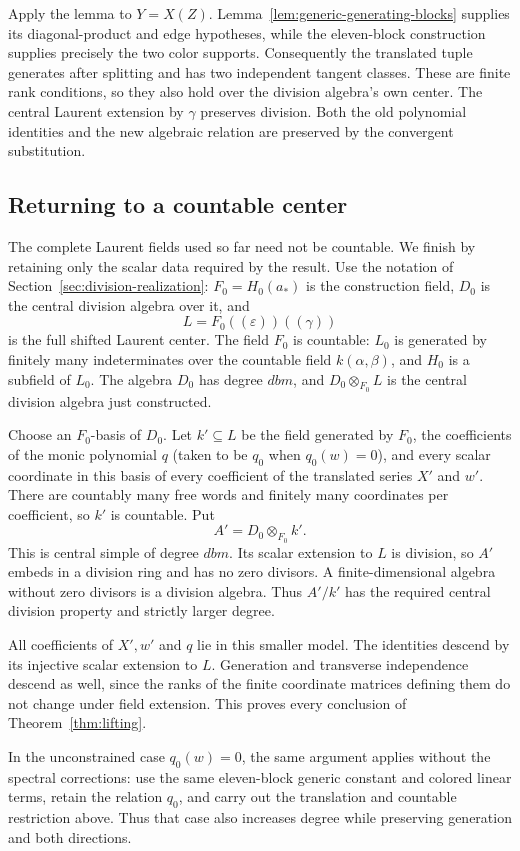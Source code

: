 \documentclass[11pt]{article}
\theoremstyle{definition}
\theoremstyle{remark}
\numberwithin{equation}{section}
\begin{document}
Apply the lemma to $Y=X(Z)$.  Lemma~\ref{lem:generic-generating-blocks}
supplies its diagonal-product and edge hypotheses, while the
eleven-block construction supplies precisely the two color supports.
Consequently the translated tuple generates after splitting and has
two independent tangent classes.  These are finite rank conditions,
so they also hold over the division algebra's own center.
The central Laurent extension by $\gamma$ preserves division.
Both the old polynomial identities and the new algebraic relation
are preserved by the convergent substitution.

\subsection{Returning to a countable center}

The complete Laurent fields used so far need not be countable.
We finish by retaining only the scalar data required by the result.
Use the notation of Section~\ref{sec:division-realization}:
$F_0=H_0(a_*)$ is the construction field, $D_0$ is the central
division algebra over it, and
\[
 L=F_0((\varepsilon))((\gamma))
\]
is the full shifted Laurent center. The field $F_0$ is countable:
$L_0$ is generated by finitely many indeterminates over the countable
field $k(\alpha,\beta)$, and $H_0$ is a subfield of $L_0$.
The algebra $D_0$ has degree $dbm$, and $D_0\otimes_{F_0}L$
is the central division algebra just constructed.

Choose an $F_0$-basis of $D_0$. Let $k'\subseteq L$ be the field
generated by $F_0$, the coefficients of the monic polynomial $q$
(taken to be $q_0$ when $q_0(w)=0$),
and every scalar coordinate in this basis of every coefficient
of the translated series $X'$ and $w'$. There are countably many
free words and finitely many coordinates per coefficient, so $k'$
is countable.  Put
\[
 A'=D_0\otimes_{F_0} k'.
\]
This is central simple of degree $dbm$.  Its scalar extension to
$L$ is division, so $A'$ embeds in a division ring and has no zero
divisors.  A finite-dimensional algebra without zero divisors is
a division algebra.  Thus $A'/k'$ has the required central division
property and strictly larger degree.

All coefficients of $X',w'$ and $q$ lie in this smaller model.
The identities descend by its injective scalar extension to $L$.
Generation and transverse independence descend as well, since
the ranks of the finite coordinate matrices defining them do not
change under field extension.  This proves every conclusion of
Theorem~\ref{thm:lifting}.

In the unconstrained case $q_0(w)=0$, the same argument applies
without the spectral corrections: use the same eleven-block
generic constant and colored linear terms, retain the relation
$q_0$, and carry out the translation and countable restriction
above.  Thus that case also increases degree while preserving
generation and both directions.



\end{document}
